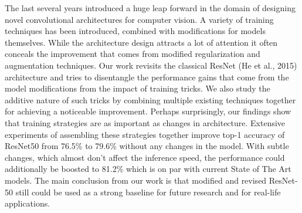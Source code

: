 
The last several years introduced a huge leap forward in the domain of designing novel convolutional architectures for computer vision. A variety of training techniques has been introduced, combined with modifications for models themselves. While the architecture design attracts a lot of attention it often conceals the improvement that comes from modified regularization and augmentation techniques. Our work revisits the classical ResNet (He et al., 2015) architecture and tries to disentangle the performance gains that come from the model modifications from the impact of training tricks. We also study the additive nature of such tricks by combining multiple existing techniques together for achieving a noticeable improvement. Perhaps surprisingly, our findings show that training strategies are as important as changes in architecture. Extensive experiments of assembling these strategies together improve top-1 accuracy of ResNet50 from 76.5\% to 79.6\% without any changes in the model. With subtle changes, which almost don't affect the inference speed, the performance could additionally be boosted to 81.2\% which is on par with current State of The Art models. The main conclusion from our work is that modified and revised ResNet-50 still could be used as a strong baseline for future research and for real-life applications.